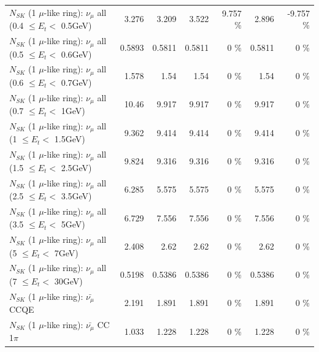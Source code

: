 \begin{table}
\begin{tabular}{| l | r | r | r  r | r  r |}
       $N_{SK}$ (1 $\mu$-like ring): $\nu_{\mu}$ all (0.4 $\leq E_{t} <$ 0.5GeV) &           3.276 &           3.209 &           3.522 &    9.757 \%  &           2.896 &   -9.757 \%  \\ 
       $N_{SK}$ (1 $\mu$-like ring): $\nu_{\mu}$ all (0.5 $\leq E_{t} <$ 0.6GeV) &          0.5893 &          0.5811 &          0.5811 &        0 \%  &          0.5811 &        0 \%  \\ 
       $N_{SK}$ (1 $\mu$-like ring): $\nu_{\mu}$ all (0.6 $\leq E_{t} <$ 0.7GeV) &           1.578 &            1.54 &            1.54 &        0 \%  &            1.54 &        0 \%  \\ 
         $N_{SK}$ (1 $\mu$-like ring): $\nu_{\mu}$ all (0.7 $\leq E_{t} <$ 1GeV) &           10.46 &           9.917 &           9.917 &        0 \%  &           9.917 &        0 \%  \\ 
         $N_{SK}$ (1 $\mu$-like ring): $\nu_{\mu}$ all (1 $\leq E_{t} <$ 1.5GeV) &           9.362 &           9.414 &           9.414 &        0 \%  &           9.414 &        0 \%  \\ 
       $N_{SK}$ (1 $\mu$-like ring): $\nu_{\mu}$ all (1.5 $\leq E_{t} <$ 2.5GeV) &           9.824 &           9.316 &           9.316 &        0 \%  &           9.316 &        0 \%  \\ 
       $N_{SK}$ (1 $\mu$-like ring): $\nu_{\mu}$ all (2.5 $\leq E_{t} <$ 3.5GeV) &           6.285 &           5.575 &           5.575 &        0 \%  &           5.575 &        0 \%  \\ 
         $N_{SK}$ (1 $\mu$-like ring): $\nu_{\mu}$ all (3.5 $\leq E_{t} <$ 5GeV) &           6.729 &           7.556 &           7.556 &        0 \%  &           7.556 &        0 \%  \\ 
           $N_{SK}$ (1 $\mu$-like ring): $\nu_{\mu}$ all (5 $\leq E_{t} <$ 7GeV) &           2.408 &            2.62 &            2.62 &        0 \%  &            2.62 &        0 \%  \\ 
          $N_{SK}$ (1 $\mu$-like ring): $\nu_{\mu}$ all (7 $\leq E_{t} <$ 30GeV) &          0.5198 &          0.5386 &          0.5386 &        0 \%  &          0.5386 &        0 \%  \\ 
\hline
\hline
\hline
                              $N_{SK}$ (1 $\mu$-like ring): $\bar{\nu_\mu}$ CCQE &           2.191 &           1.891 &           1.891 &        0 \%  &           1.891 &        0 \%  \\ 
                         $N_{SK}$ (1 $\mu$-like ring): $\bar{\nu_\mu}$ CC 1$\pi$ &           1.033 &           1.228 &           1.228 &        0 \%  &           1.228 &        0 \%  \\ 

\end{tabular}
\end{table}
